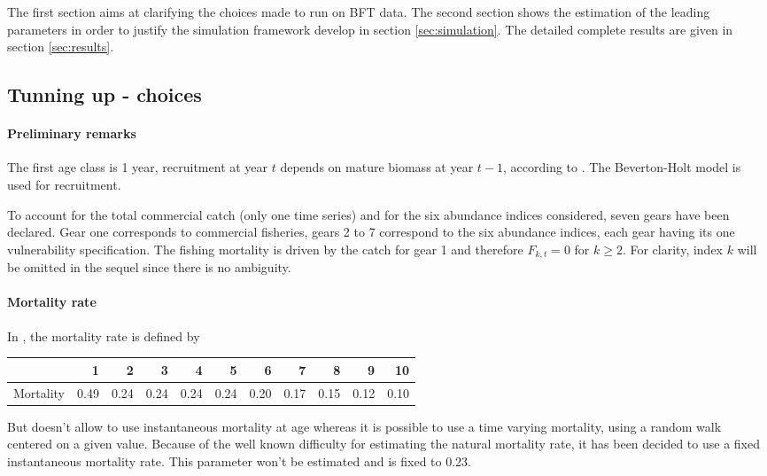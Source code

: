 The first section  aims at clarifying the choices made  to run \iscam
on BFT  data. The second section  shows the estimation of  the leading
parameters in  order to  justify the  simulation framework  develop in
section \ref{sec:simulation}. The detailed  complete results are given
in section \ref{sec:results}.




\subsection{Tunning up \iscam - choices}

\paragraph{Preliminary remarks}
The first age class is 1 year, recruitment at year $t$ depends on
mature  biomass  at  year  $t-1$,  according  to  \cite{tuna2012}.  The
Beverton-Holt model is used for recruitment.


To account for the total commercial catch (only one time series) and
for the six abundance indices considered,  seven gears have been declared. Gear
one corresponds  to commercial fisheries,  gears 2 to 7  correspond to
the six  abundance indices, each  gear having its  one vulnerability
specification. The fishing mortality is  driven by the catch for gear
1 and  therefore $F_{k,t}=0$ for  $k \geq  2$. For clarity,  index $k$
will be omitted in the sequel since there is no ambiguity.

\paragraph{Mortality rate}
In \cite{tuna2012}, the mortality rate is defined by 
\begin{table}[ht]
\centering
\begin{tabular}{rrrrrrrrrrr}
  \hline
 & 1 & 2 & 3 & 4 & 5 & 6 & 7 & 8 & 9 & 10 \\ 
  \hline
Mortality & 0.49 & 0.24 & 0.24 & 0.24 & 0.24 & 0.20 & 0.17 & 0.15 & 0.12 & 0.10 \\ 
   \hline
\end{tabular}
\end{table}


But \iscam doesn't allow to use  instantaneous mortality at age whereas  it is possible to use a time varying mortality, using a random walk centered on a given value.
Because of the well known difficulty for estimating the natural mortality rate, it has been decided to use a fixed instantaneous mortality rate.
This parameter won't be estimated and is fixed to 0.23.


